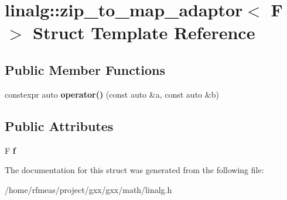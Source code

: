 \hypertarget{structlinalg_1_1zip__to__map__adaptor}{}\section{linalg\+:\+:zip\+\_\+to\+\_\+map\+\_\+adaptor$<$ F $>$ Struct Template Reference}
\label{structlinalg_1_1zip__to__map__adaptor}
\subsection*{Public Member Functions}
\begin{DoxyCompactItemize}
\item 
constexpr auto {\bfseries operator()} (const auto \&a, const auto \&b)\hypertarget{structlinalg_1_1zip__to__map__adaptor_a548bd6733268b7e5d6b30809024be350}{}\label{structlinalg_1_1zip__to__map__adaptor_a548bd6733268b7e5d6b30809024be350}

\end{DoxyCompactItemize}
\subsection*{Public Attributes}
\begin{DoxyCompactItemize}
\item 
F {\bfseries f}\hypertarget{structlinalg_1_1zip__to__map__adaptor_a7fe1efbfb06fa75981d8c230fb35ea04}{}\label{structlinalg_1_1zip__to__map__adaptor_a7fe1efbfb06fa75981d8c230fb35ea04}

\end{DoxyCompactItemize}


The documentation for this struct was generated from the following file\+:\begin{DoxyCompactItemize}
\item 
/home/rfmeas/project/gxx/gxx/math/linalg.\+h\end{DoxyCompactItemize}
